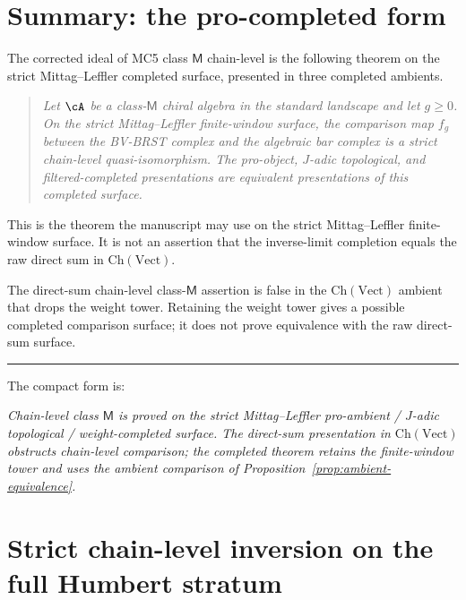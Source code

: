 \section{Summary: the pro-completed form}
\label{sec:mc5-platonic-summary}

The corrected ideal of MC5 class $\mathsf{M}$ chain-level is the
following theorem on the strict Mittag--Leffler completed surface,
presented in three completed ambients.

\begin{quote}
\emph{Let $\cA$ be a class-$\mathsf{M}$ chiral algebra in the standard
landscape and let $g \geq 0$. On the strict Mittag--Leffler
finite-window surface, the comparison map $f_g$ between the BV-BRST
complex and the algebraic bar complex is a strict chain-level
quasi-isomorphism. The pro-object, $J$-adic topological, and
filtered-completed presentations are equivalent presentations of this
completed surface.}
\end{quote}

This is the theorem the manuscript may use on the strict
Mittag--Leffler finite-window surface. It is not an assertion that the
inverse-limit completion equals the raw direct sum in
$\mathrm{Ch}(\mathrm{Vect})$.

The direct-sum chain-level class-\(\mathsf M\) assertion is false in the
\(\mathrm{Ch}(\mathrm{Vect})\) ambient that drops the weight tower.  Retaining
the weight tower gives a possible completed comparison surface; it does not
prove equivalence with the raw direct-sum surface.

\begin{center}
\rule{0.3\textwidth}{0.4pt}
\end{center}

The compact form is:

\emph{Chain-level class $\mathsf{M}$ is proved on the strict
Mittag--Leffler pro-ambient / $J$-adic topological / weight-completed
surface. The direct-sum presentation in $\mathrm{Ch}(\mathrm{Vect})$
obstructs chain-level comparison; the completed theorem retains the
finite-window tower and uses the ambient comparison of
Proposition~\ref{prop:ambient-equivalence}.}

\section{Strict chain-level inversion on the full Humbert stratum}
\label{sec:mc5-humbert-stratum-global-strict}

